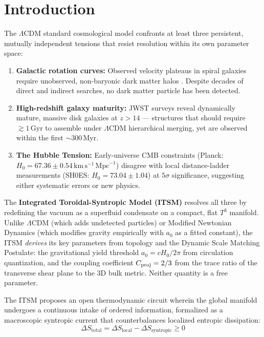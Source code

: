 \documentclass[aps,prd,10pt,twocolumn,superscriptaddress,nofootinbib,floatfix]{revtex4-2}
\begin{document}
\maketitle

\section{\label{sec:intro}Introduction}

The $\Lambda$CDM standard cosmological model confronts at least three persistent, mutually independent tensions that resist resolution within its own parameter space:
\begin{enumerate}
    \item \textbf{Galactic rotation curves:} Observed velocity plateaus in spiral galaxies require unobserved, non-baryonic dark matter halos \cite{rubin}. Despite decades of direct and indirect searches, no dark matter particle has been detected.
    \item \textbf{High-redshift galaxy maturity:} JWST surveys reveal dynamically mature, massive disk galaxies at $z > 14$ \cite{jwst_labbe, jwst_curtis_lake, jwst_carniani} --- structures that should require $\gtrsim 1\,\text{Gyr}$ to assemble under $\Lambda$CDM hierarchical merging, yet are observed within the first $\sim 300\,\text{Myr}$.
    \item \textbf{The Hubble Tension:} Early-universe CMB constraints (Planck: $H_0 = 67.36 \pm 0.54\,\text{km}\,\text{s}^{-1}\,\text{Mpc}^{-1}$) \cite{planck} disagree with local distance-ladder measurements (SH0ES: $H_0 = 73.04 \pm 1.04$) \cite{riess2022} at $5\sigma$ significance, suggesting either systematic errors or new physics.
\end{enumerate}

The \textbf{Integrated Toroidal-Syntropic Model (ITSM)} resolves all three by redefining the vacuum as a superfluid condensate on a compact, flat $T^3$ manifold. Unlike $\Lambda$CDM (which adds undetected particles) or Modified Newtonian Dynamics \cite{mond} (which modifies gravity empirically with $a_0$ as a fitted constant), the ITSM \emph{derives} its key parameters from topology and the Dynamic Scale Matching Postulate: the gravitational yield threshold $a_0 = cH_0/2\pi$ from circulation quantization, and the coupling coefficient $C_{\rm proj} = 2/3$ from the trace ratio of the transverse shear plane to the 3D bulk metric. Neither quantity is a free parameter.

The ITSM proposes an open thermodynamic circuit wherein the global manifold undergoes a continuous intake of ordered information, formalized as a macroscopic syntropic current that counterbalances localized entropic dissipation:
\begin{equation}
\Delta S_{\text{total}} = \Delta S_{\text{local}} - \Delta S_{\text{syntropic}} \ge 0
\end{equation}
\end{document}
